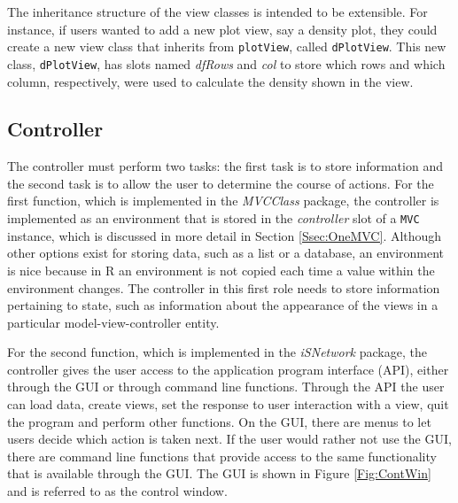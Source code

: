 \documentclass{article}[11pt]
\newcommand{\Robject}[1]{{\texttt{#1}}}
\newcommand{\Rpackage}[1]{{\textit{#1}}}
\newcommand{\Rslot}[1]{\textsl{#1}}
\newcommand{\Rclass}[1]{\texttt{#1}}
\begin{document}
The inheritance structure of the view classes is intended to be
extensible.  For instance, if users wanted to add a new plot view, say a
density plot, they could create a new view class that inherits from
\Rclass{plotView}, called \Rclass{dPlotView}.  This new class,
\Rclass{dPlotView}, has slots named \Rslot{dfRows} and \Rslot{col} to store
which rows and which column, respectively, were used to calculate the density
shown in the view.

\subsection{Controller}\label{Ssec:OneCont}

The controller must perform two tasks: the first task is to store information
and the second task is to allow the user to determine the course of actions.
For the first function, which is implemented in the \Rpackage{MVCClass}
package, the controller is implemented as an environment that is stored in the
\Rslot{controller} slot of a \Robject{MVC} instance, which is discussed in
more detail in Section \ref{Ssec:OneMVC}.  Although other options exist for
storing data, such as a list or a database, an environment is nice because in
R an environment is not copied each time a value within the environment
changes.  The controller in this first role needs to store information
pertaining to state, such as information about the appearance of the views in
a particular model-view-controller entity.

For the second function, which is implemented in the \Rpackage{iSNetwork}
package, the controller gives the user access to the application program
interface (API), either through the GUI or through command line functions.
Through the API the user can load data, create views, set the response to user
interaction with a view, quit the program and perform other functions.  On the
GUI, there are menus to let users decide which action is taken next.  If
the user would rather not use the GUI, there are command line functions that
provide access to the same functionality that is available through the GUI.
The GUI is shown in Figure \ref{Fig:ContWin} and is referred to as the
control window.
\end{document}
